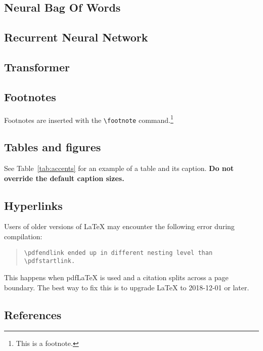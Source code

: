\documentclass[11pt]{article}
\begin{document}
\subsection{Neural Bag Of Words}


\subsection{Recurrent Neural Network}
\subsection{Transformer}

\subsection{Footnotes}

Footnotes are inserted with the \verb|\footnote| command.\footnote{This is a footnote.}

\subsection{Tables and figures}

See Table~\ref{tab:accents} for an example of a table and its caption.
\textbf{Do not override the default caption sizes.}

\subsection{Hyperlinks}

Users of older versions of \LaTeX{} may encounter the following error during compilation: 
\begin{quote}
\tt\verb|\pdfendlink| ended up in different nesting level than \verb|\pdfstartlink|.
\end{quote}
This happens when pdf\LaTeX{} is used and a citation splits across a page boundary. The best way to fix this is to upgrade \LaTeX{} to 2018-12-01 or later.

\subsection{References}
\end{document}
